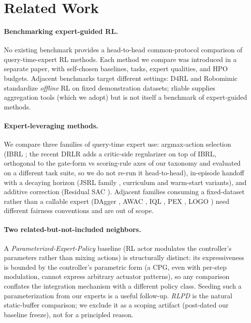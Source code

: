 \documentclass{article}
\begin{document}
\section{Related Work}
\label{sec:related}

\paragraph{Benchmarking expert-guided RL.}
No existing benchmark provides a head-to-head common-protocol
comparison of query-time-expert RL methods. Each method we compare
was introduced in a separate paper, with self-chosen baselines,
tasks, expert qualities, and HPO budgets. Adjacent benchmarks
target different settings: D4RL \citep{fu2020d4rl} and Robomimic
\citep{mandlekar2021robomimic} standardize \emph{offline} RL on
fixed demonstration datasets; rliable \citep{agarwal2021rliable}
supplies aggregation tools (which we adopt) but is not itself a
benchmark of expert-guided methods.

\paragraph{Expert-leveraging methods.}
We compare three families of query-time expert use: argmax-action
selection (IBRL \citep{hu2023ibrl}; the recent DRLR
\citep{shen2026drlr} adds a critic-side regularizer on top of
IBRL, orthogonal to the gate-form vs scoring-rule axes of our
taxonomy and evaluated on a different task suite, so we do not
re-run it head-to-head), in-episode handoff with a decaying
horizon (JSRL family \citep{uchendu2023jsrl}, curriculum and
warm-start variants), and additive correction (Residual SAC
\citep{johannink2019residual}).
Adjacent families consuming a fixed-dataset rather than a callable
expert (DAgger \citep{ross2011dagger}, AWAC \citep{nair2020awac},
IQL \citep{kostrikov2022iql}, PEX \citep{zhang2023pex}, LOGO
\citep{rengarajan2022logo}) need different fairness conventions and
are out of scope.

\paragraph{Two related-but-not-included neighbors.}
A \emph{Parameterized-Expert-Policy} baseline (RL actor modulates
the controller's parameters rather than mixing actions) is
structurally distinct: its expressiveness is bounded by the
controller's parametric form (a CPG, even with per-step
modulation, cannot express arbitrary actuator patterns), so any
comparison conflates the integration mechanism with a different
policy class. Seeding such a parameterization from our experts is
a useful follow-up. \emph{RLPD} \citep{ball2023rlpd} is the
natural static-buffer comparison; we exclude it as a scoping
artifact (post-dated our baseline freeze), not for a principled
reason.
\end{document}
